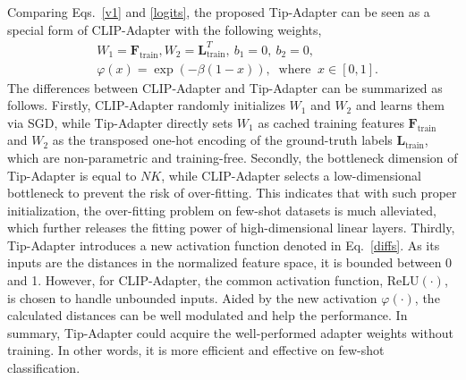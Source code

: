 \documentclass[10pt,twocolumn,letterpaper]{article}
\begin{document}
Comparing Eqs.~\eqref{v1} and \eqref{logits}, the proposed Tip-Adapter can be seen as a special form of CLIP-Adapter with the following weights,
\begin{align}
\label{diffs}
    &W_1 = \mathbf{F}_\mathrm{train},  W_2 = \mathbf{L}^T_\mathrm{train},
   \ b_1 = 0, \ b_2 =0, \\
    &\varphi(x) = \operatorname{exp}(- \beta (1 - x)), \  \text{ where } \  x \in [0, 1].
\end{align}
The differences between CLIP-Adapter and Tip-Adapter can be summarized as follows. Firstly, CLIP-Adapter randomly initializes $W_1$ and $W_2$ and learns them via SGD, while Tip-Adapter directly sets $W_1$ as cached training features $\mathbf{F}_\mathrm{train}$ and $W_2$ as the transposed one-hot encoding of the ground-truth labels $\mathbf{L}_\mathrm{train}$, which are non-parametric and training-free. 
Secondly, the bottleneck dimension of Tip-Adapter is equal to $NK$, while CLIP-Adapter selects a low-dimensional bottleneck to prevent the risk of over-fitting. This indicates that with such proper initialization, the over-fitting problem on few-shot datasets is much alleviated, which further releases the fitting power of high-dimensional linear layers.
Thirdly, Tip-Adapter introduces a new activation function denoted in Eq.~\eqref{diffs}. As its inputs are the distances in the normalized feature space, it is bounded between 0 and 1. However, for CLIP-Adapter, the common activation function, ReLU$(\cdot)$, is chosen to handle unbounded inputs. Aided by the new activation $\varphi(\cdot)$, the calculated distances can be well modulated and help the performance.
In summary, Tip-Adapter could acquire the well-performed adapter weights without training. In other words, it is more efficient and effective on few-shot classification.


\end{document}
